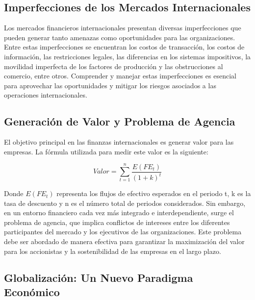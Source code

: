 \documentclass[
  letterpaper,
  DIV=11,
  numbers=noendperiod]{scrartcl}
\begin{document}
\hypertarget{imperfecciones-de-los-mercados-internacionales}{%
\subsection{Imperfecciones de los Mercados
Internacionales}\label{imperfecciones-de-los-mercados-internacionales}}

Los mercados financieros internacionales presentan diversas
imperfecciones que pueden generar tanto amenazas como oportunidades para
las organizaciones. Entre estas imperfecciones se encuentran los costos
de transacción, los costos de información, las restricciones legales,
las diferencias en los sistemas impositivos, la movilidad imperfecta de
los factores de producción y las obstrucciones al comercio, entre otros.
Comprender y manejar estas imperfecciones es esencial para aprovechar
las oportunidades y mitigar los riesgos asociados a las operaciones
internacionales.

\hypertarget{generaciuxf3n-de-valor-y-problema-de-agencia}{%
\subsection{Generación de Valor y Problema de
Agencia}\label{generaciuxf3n-de-valor-y-problema-de-agencia}}

El objetivo principal en las finanzas internacionales es generar valor
para las empresas. La fórmula utilizada para medir este valor es la
siguiente:

\[
Valor = \sum_{t=1}^{n} \frac{E(FE_t)}{(1+k)^t}
\]

Donde \(E(FE_t)\) representa los flujos de efectivo esperados en el
periodo t, k es la tasa de descuento y n es el número total de periodos
considerados. Sin embargo, en un entorno financiero cada vez más
integrado e interdependiente, surge el problema de agencia, que implica
conflictos de intereses entre los diferentes participantes del mercado y
los ejecutivos de las organizaciones. Este problema debe ser abordado de
manera efectiva para garantizar la maximización del valor para los
accionistas y la sostenibilidad de las empresas en el largo plazo.

\hypertarget{globalizaciuxf3n-un-nuevo-paradigma-econuxf3mico}{%
\subsection{Globalización: Un Nuevo Paradigma
Económico}\label{globalizaciuxf3n-un-nuevo-paradigma-econuxf3mico}}
\end{document}
